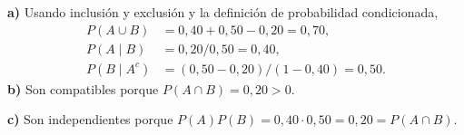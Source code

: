 \textbf{a)} Usando inclusión y exclusión y la definición de probabilidad condicionada,
\[
\begin{aligned}
P(A\cup B)&=0{,}40+0{,}50-0{,}20=\boxed{0{,}70},\\
P(A\mid B)&=0{,}20/0{,}50=\boxed{0{,}40},\\
P(B\mid A^c)&=(0{,}50-0{,}20)/(1-0{,}40)=\boxed{0{,}50}.
\end{aligned}
\]
\textbf{b)} Son compatibles porque $P(A\cap B)=0{,}20>0$.

\textbf{c)} Son independientes porque $P(A)P(B)=0{,}40\cdot0{,}50=0{,}20=P(A\cap B)$.
